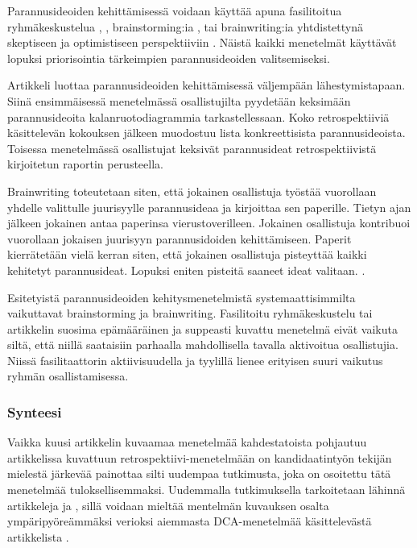 Parannusideoiden kehittämisessä voidaan käyttää apuna fasilitoitua ryhmäkeskustelua \citep{card1998learning}, \citep{karlsson2006case}, brainstorming:ia \citep{staalhane2004root}, tai brainwriting:ia yhtdistettynä skeptiseen ja optimistiseen perspektiiviin \citep{Lehtinen2011}. Näistä kaikki menetelmät käyttävät lopuksi priorisointia tärkeimpien parannusideoiden valitsemiseksi. 

Artikkeli \citep{staalhane2003post} luottaa parannusideoiden kehittämisessä väljempään lähestymistapaan. Siinä ensimmäisessä menetelmässä osallistujilta pyydetään keksimään parannusideoita kalanruotodiagrammia tarkastellessaan. Koko retrospektiiviä käsittelevän kokouksen jälkeen muodostuu lista konkreettisista parannusideoista. Toisessa menetelmässä osallistujat keksivät parannusideat retrospektiivistä kirjoitetun raportin perusteella. \citep{staalhane2003post}

Brainwriting toteutetaan siten, että jokainen osallistuja työstää vuorollaan yhdelle valittulle juurisyylle parannusideaa ja kirjoittaa sen paperille. Tietyn ajan jälkeen jokainen antaa paperinsa vierustoverilleen. Jokainen osallistuja kontribuoi vuorollaan jokaisen juurisyyn parannusidoiden kehittämiseen. Paperit kierrätetään vielä kerran siten, että jokainen osallistuja pisteyttää kaikki kehitetyt parannusideat. Lopuksi eniten pisteitä saaneet ideat valitaan. \citep{Lehtinen2011}.

Esitetyistä parannusideoiden kehitysmenetelmistä systemaattisimmilta vaikuttavat brainstorming ja brainwriting. Fasilitoitu ryhmäkeskustelu tai artikkelin \citep{staalhane2003post} suosima epämääräinen ja suppeasti kuvattu menetelmä eivät vaikuta siltä, että niillä saataisiin parhaalla mahdollisella tavalla aktivoitua osallistujia. Niissä fasilitaattorin aktiivisuudella ja tyylillä lienee erityisen suuri vaikutus ryhmän osallistamisessa.

\subsubsection{Synteesi}
Vaikka kuusi artikkelin kuvaamaa menetelmää kahdestatoista pohjautuu artikkelissa \citep{birk2002postmortem} kuvattuun retrospektiivi-menetelmään on kandidaatintyön tekijän mielestä järkevää painottaa silti uudempaa tutkimusta, joka on osoitettu tätä menetelmää tuloksellisemmaksi. Uudemmalla tutkimuksella tarkoitetaan lähinnä artikkeleja \citep{Lehtinen2011} ja \citep{Bjornson2009}, sillä \citep{kalinowski2012evidence} voidaan mieltää mentelmän kuvauksen osalta ympäripyöreämmäksi verioksi aiemmasta DCA-menetelmää käsittelevästä artikkelista \citep{card1998learning}.

